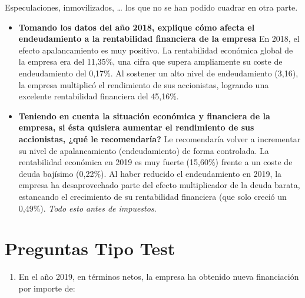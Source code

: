 \documentclass[12pt]{book} %
\providecommand{\tightlist}{%
  \setlength{\itemsep}{0pt}\setlength{\parskip}{0pt}}
\begin{document}
Especulaciones, inmovilizados, \ldots{} los que no se han podido cuadrar
en otra parte.

\begin{itemize}
\item
  \textbf{Tomando los datos del año 2018, explique cómo afecta el
  endeudamiento a la rentabilidad financiera de la empresa} En 2018, el
  efecto apalancamiento es muy positivo. La rentabilidad económica
  global de la empresa era del 11,35\%, una cifra que supera ampliamente
  su coste de endeudamiento del 0,17\%. Al sostener un alto nivel de
  endeudamiento (3,16), la empresa multiplicó el rendimiento de sus
  accionistas, logrando una excelente rentabilidad financiera del
  45,16\%.
\item
  \textbf{Teniendo en cuenta la situación económica y financiera de la
  empresa, si ésta quisiera aumentar el rendimiento de sus accionistas,
  ¿qué le recomendaría?} Le recomendaría volver a incrementar su nivel
  de apalancamiento (endeudamiento) de forma controlada. La rentabilidad
  económica en 2019 es muy fuerte (15,60\%) frente a un coste de deuda
  bajísimo (0,22\%). Al haber reducido el endeudamiento en 2019, la
  empresa ha desaprovechado parte del efecto multiplicador de la deuda
  barata, estancando el crecimiento de su rentabilidad financiera (que
  solo creció un 0,49\%). \emph{Todo esto antes de impuestos.}
\end{itemize}

\hypertarget{preguntas-tipo-test}{%
\section{Preguntas Tipo Test}\label{preguntas-tipo-test}}

\begin{enumerate}
\def\labelenumi{\arabic{enumi}.}
\tightlist
\item
  En el año 2019, en términos netos, la empresa ha obtenido nueva
  financiación por importe de:
\end{enumerate}
\end{document}

